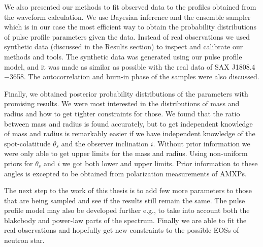 \documentclass{wihuri}
\def\source{SAX J1808.4$-$3658}
\def\thetas{\theta_{s}}
\begin{document}
We also presented our methods to fit observed data to the profiles obtained from the waveform calculation. We use Bayesian inference and the ensemble sampler which is in our case the most efficient way to obtain the probability distributions of pulse profile parameters given the data. Instead of real observations we used synthetic data (discussed in the Results section) to inspect and calibrate our methods and tools. The synthetic data was generated using our pulse profile model, and it was made as similar as possible with the real data of \source. The autocorrelation and burn-in phase of the samples were also discussed.

Finally, we obtained posterior probability distributions of the parameters with promising results. We were most interested in the distributions of mass and radius and how to get tighter constraints for those. We found that the ratio between mass and radius is found accurately, but to get independent knowledge of mass and radius is remarkably easier if we have independent knowledge of the spot-colatitude $\thetas$ and the observer inclination $i$. Without prior information we were only able to get upper limits for the mass and radius. Using non-uniform priors for $\thetas$ and $i$ we got both lower and upper limits. Prior information to these angles is excepted to be obtained from polarization measurements of AMXPs.  

The next step to the work of this thesis is to add few more parameters to those that are being sampled and see if the results still remain the same. The pulse profile model may also be developed further e.g., to take into account both the blakcbody and power-law parts of the spectrum. Finally we are able to fit the real observations and hopefully get new constraints to the possible EOSs of neutron star.  





\iffalse
\begin{figure}
\begin{center}
\setlength{\unitlength}{1cm}
\begin{picture}(6,6)(-3,-3)
\put(-1.5,0){\vector(1,0){3}}
\put(2.7,-0.1){$\chi$}
\put(0,-1.5){\vector(0,1){3}}
\multiput(-2.5,1)(0.4,0){13}
{\line(1,0){0.2}}
\multiput(-2.5,-1)(0.4,0){13}
{\line(1,0){0.2}}
\put(0.2,1.4)
{$\beta=v/c=\tanh\chi$}
\qbezier(0,0)(0.8853,0.8853)
(2,0.9640)
\qbezier(0,0)(-0.8853,-0.8853)
(-2,-0.9640)
\end{picture}
\caption{Tässä on hieno kuva}
\label{kuva1}
\end{center}
\end{figure}
\fi
\end{document}
